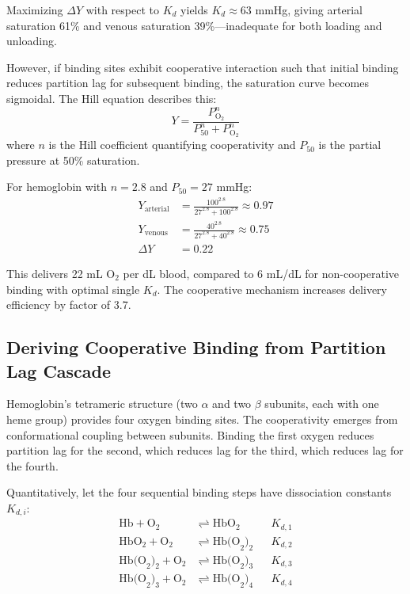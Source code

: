 \documentclass[10pt,twocolumn,a4paper]{article}
\theoremstyle{remark}
\begin{document}
Maximizing $\Delta Y$ with respect to $K_{d}$ yields $K_{d} \approx 63$ mmHg, giving arterial saturation 61\% and venous saturation 39\%—inadequate for both loading and unloading.

However, if binding sites exhibit cooperative interaction such that initial binding reduces partition lag for subsequent binding, the saturation curve becomes sigmoidal. The Hill equation describes this:
\begin{equation}
Y = \frac{P_{\mathrm{O}_{2}}^{n}}{P_{50}^{n} + P_{\mathrm{O}_{2}}^{n}}
\label{eq:hill}
\end{equation}
where $n$ is the Hill coefficient quantifying cooperativity and $P_{50}$ is the partial pressure at 50\% saturation.

For hemoglobin with $n = 2.8$ and $P_{50} = 27$ mmHg:
\begin{align}
Y_{\mathrm{arterial}} &= \frac{100^{2.8}}{27^{2.8} + 100^{2.8}} \approx 0.97 \\
Y_{\mathrm{venous}} &= \frac{40^{2.8}}{27^{2.8} + 40^{2.8}} \approx 0.75 \\
\Delta Y &= 0.22
\end{align}

This delivers 22 mL O$_{2}$ per dL blood, compared to 6 mL/dL for non-cooperative binding with optimal single $K_{d}$. The cooperative mechanism increases delivery efficiency by factor of 3.7.

\subsection{Deriving Cooperative Binding from Partition Lag Cascade}

Hemoglobin's tetrameric structure (two $\alpha$ and two $\beta$ subunits, each with one heme group) provides four oxygen binding sites. The cooperativity emerges from conformational coupling between subunits. Binding the first oxygen reduces partition lag for the second, which reduces lag for the third, which reduces lag for the fourth.

Quantitatively, let the four sequential binding steps have dissociation constants $K_{d,i}$:
\begin{align}
\mathrm{Hb} + \mathrm{O}_{2} &\rightleftharpoons \mathrm{HbO}_{2} &&K_{d,1} \\
\mathrm{HbO}_{2} + \mathrm{O}_{2} &\rightleftharpoons \mathrm{Hb(O}_{2})_{2} &&K_{d,2} \\
\mathrm{Hb(O}_{2})_{2} + \mathrm{O}_{2} &\rightleftharpoons \mathrm{Hb(O}_{2})_{3} &&K_{d,3} \\
\mathrm{Hb(O}_{2})_{3} + \mathrm{O}_{2} &\rightleftharpoons \mathrm{Hb(O}_{2})_{4} &&K_{d,4}
\end{align}
\end{document}
